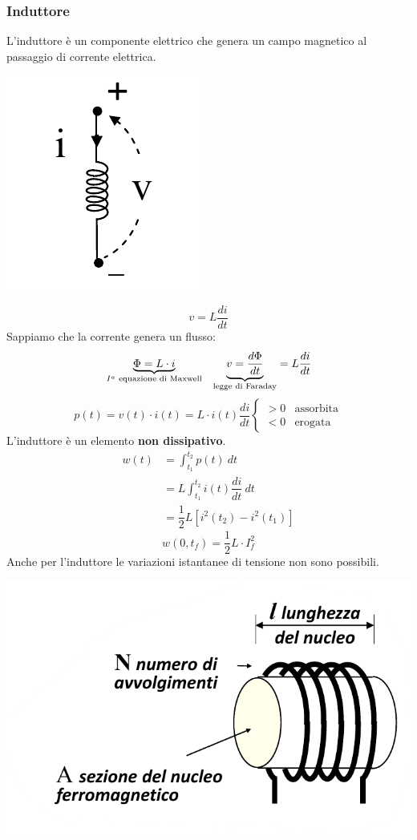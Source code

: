 \documentclass{article}
\begin{document}
\subsubsection{Induttore}
L'induttore è un componente elettrico che genera un campo magnetico al passaggio di corrente elettrica.
\begin{center}
    \includegraphics[scale=0.4]{Image/Induttore.png}
\end{center}
\[
    v= L \dfrac{di}{dt}
\]
Sappiamo che la corrente genera un flusso:
\begin{align*}
    &\underbrace{\Phi = L \cdot i}_{I^a\text{ equazione di Maxwell}} & \underbrace{v= \dfrac{d \Phi}{dt}}_{\text{legge di Faraday}} = L \dfrac{di}{dt}
\end{align*}
\[
    p(t) = v(t) \cdot i(t) = L \cdot i(t) \dfrac{di}{dt} \begin{cases}
        >0 &\text{assorbita}\\
        <0 &\text{erogata}
    \end{cases}
\]
L'induttore è un elemento \textbf{non dissipativo}.
\begin{align*}
    w(t) &= \int_{t_1}^{t_2} p(t) \ dt\\
    &=L \int_{t_1}^{t_2}i(t) \dfrac{di}{dt} \ dt \\
    &= \dfrac{1}{2} L \left[ i^2(t_2) -i^2(t_1)  \right]
\end{align*}
\[
    w(0,t_f) = \dfrac{1}{2} L \cdot  I^2_f
\]
Anche per l'induttore le variazioni istantanee di tensione non sono possibili.
\begin{center}
    \includegraphics[scale=0.4]{Image/Induttore ferr.png}
\end{center}
\end{document}
